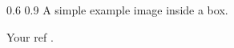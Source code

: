 
\begin{centerBoxImageStyle}
    {}     
    {0.6\linewidth}                         
    {0.9\linewidth}                         
    {A simple example image inside a box.}  
    {}               
\end{centerBoxImageStyle}

Your ref \parencite{Hang2024}.